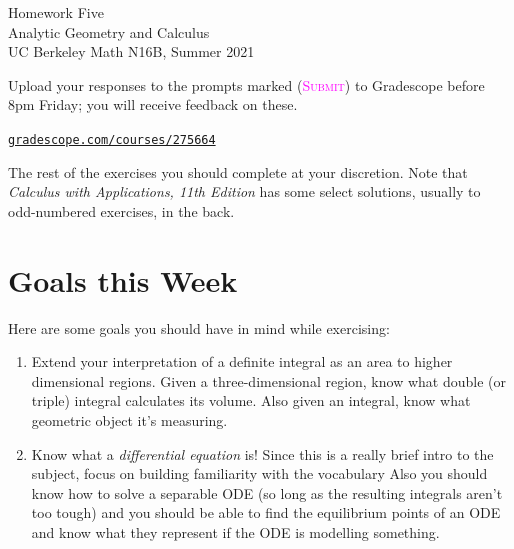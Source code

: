 

\usepackage{fourier}



\pagestyle{empty}




\begin{center}
    {\Huge{Homework Five}}
    \\ \footnotesize{Analytic Geometry and Calculus}
    \\ \footnotesize{UC Berkeley Math N16B, Summer 2021}
\end{center}
\vspace{2em}

Upload your responses to the prompts marked
(\textsc{\textcolor{magenta}{Submit}})
to Gradescope before 8pm Friday; 
you will receive feedback on these.
\begin{center}
    \href{https://www.gradescope.com/courses/275664}%
    {\texttt{gradescope.com/courses/275664}}
\end{center}
The rest of the exercises you should complete at your discretion.
Note that \emph{Calculus with Applications, 11th Edition} 
has some select solutions, usually to odd-numbered exercises, in the back.


\section*{Goals this Week}

Here are some goals you should have in mind while exercising:
\begin{enumerate}
    \item 
        Extend your interpretation of a definite integral as an area 
        to higher dimensional regions. 
        Given a three-dimensional region, 
        know what double (or triple) integral calculates its volume. 
        Also given an integral, know what geometric object it's measuring.

    \item 
        Know what a \emph{differential equation} is!
        Since this is a really brief intro to the subject,  
        focus on building familiarity with the vocabulary
        Also you should know how to solve a separable ODE
        (so long as the resulting integrals aren't too tough)
        and you should be able to find the equilibrium points
        of an ODE and know what they represent if the ODE
        is modelling something.
\end{enumerate}

